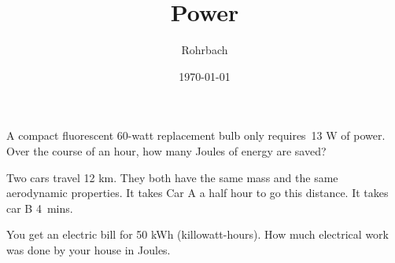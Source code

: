\documentclass[10pt]{exam}
\title{Power}
\author{Rohrbach}
\date{\today}
\begin{document}
\maketitle

\begin{questions}
  \question
      A compact fluorescent 60-watt replacement bulb only requires~13 W of power. Over the course of an hour, how many Joules of energy are saved?
      \vs[3]

  \question
    Two cars travel 12 km. They both have the same mass and the same aerodynamic properties. It takes Car A a half hour to go this distance. It takes car B 4~mins.


  \question
    You get an electric bill for 50 kWh (killowatt-hours). How much electrical work was done by your house in Joules.
    \vs[3]
  
\end{questions}
\end{document}
